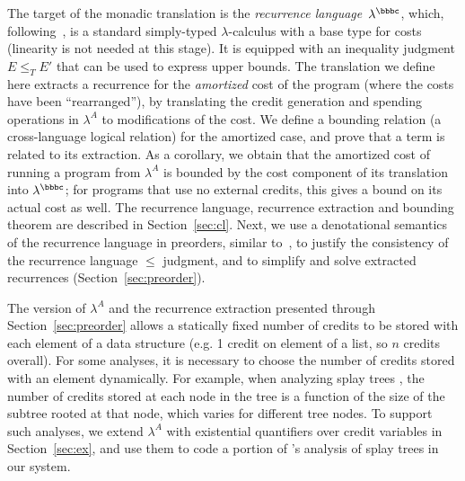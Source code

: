 The target of the monadic translation is the \emph{recurrence
language}~$\lambda^{\bbbc}$, which,
following~\cite{danner-et-al:icfp15,hudson}, is a
standard simply-typed $\lambda$-calculus with a base type for costs
(linearity is not needed at this stage). It is equipped with an
inequality judgment $E \le_T E'$ that can be used to express upper
bounds.  The translation we define here extracts a recurrence for the
\emph{amortized} cost of the program (where the costs have been
``rearranged''), by translating the credit generation and spending
operations in $\lambda^A$ to modifications of the cost.  We define a
bounding relation (a cross-language logical relation) for the amortized
case, and prove that a term is related to its extraction.  As a
corollary, we obtain that the amortized cost of running a program from
$\lambda^A$ is bounded by the cost component of its translation into
$\lambda^{\bbbc}$; for programs that use no external credits, this gives
a bound on its actual cost as well.  The recurrence language, recurrence
extraction and bounding theorem are described in Section~\ref{sec:cl}.
Next, we use a denotational semantics of the recurrence language in
preorders, similar to~\cite{danner-et-al:icfp15}, to justify the
consistency of the recurrence language $\le$ judgment, and to simplify
and solve extracted recurrences (Section~\ref{sec:preorder}).

The version of $\lambda^A$ and the recurrence extraction presented
through Section~\ref{sec:preorder} allows a statically fixed number of
credits to be stored with each element of a data structure (e.g. 1
credit on element of a list, so $n$ credits overall).  For some
analyses, it is necessary to choose the number of credits stored with an
element dynamically.  For example, when analyzing
splay trees \cite{sleator-tarjan-85}, the number of
credits stored at each node in the tree is a function of the size of the
subtree rooted at that node, which varies for different tree nodes.  To
support such analyses, we extend $\lambda^A$
with existential quantifiers over credit variables
in Section~\ref{sec:ex}, and use them to code
a portion of \citet{okasaki:purely-functional-data-structures}'s
analysis of splay trees in our system.  

